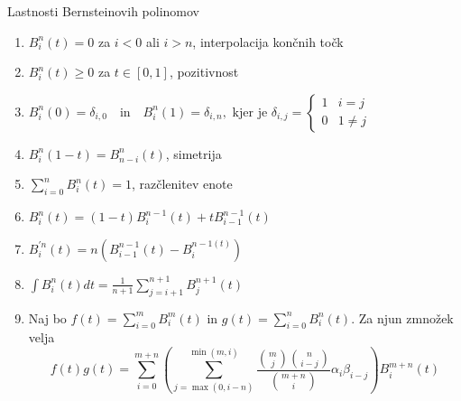 \documentclass[isrm2, tisk]{fmfdelo}
\begin{document}
    \begin{izrek}{Lastnosti Bernsteinovih polinomov}
        \label{izrek:bernsteinovi_lastnosti}
        \begin{enumerate}
            \item $B_i^n(t) = 0$ za $i<0$ ali $i>n$, interpolacija končnih točk \label{izrek:bernsteinovi_lastnosti:interpolacija}
            \item $B_i^n(t) \geq 0$ za $t\in[0,1]$, pozitivnost \label{izrek:bernsteinovi_lastnosti:pozitivnost}
            \item $B_i^n(0) = \delta_{i,0} \quad \text{in} \quad  B_i^n(1) = \delta_{i,n}, \text{ kjer je }  \delta_{i,j} = \begin{cases}
                                                                                                                                1 & i=j \\
                                                                                                                                0 & 1\neq j
            \end{cases}$
            \item $B_i^n(1-t) = B^n_{n-i}(t)$, simetrija \label{izrek:bernsteinovi_lastnosti:simetrija}
            \item $\sum_{i=0}^{n}B_{i}^{n}(t) = 1$, razčlenitev enote \label{izrek:bernsteinovi_lastnosti:enota}
            \item $B_i^n(t) = (1-t)B_i^{n-1}(t) + tB_{i-1}^{n-1}(t)$ \label{izrek:bernsteinovi_lastnosti:rekruzija}
            \item $B_{i}^{\prime n}(t)=n(B_{i-1}^{n-1}(t) - B_{i}^{n-1(t)})$ \label{izrek:bernsteinovi_lastnosti:odvod}
            \item $\int B_i^n(t)dt= \frac{1}{n+1}\sum^{n+1}_{j=i+1}B_{j}^{n+1}(t)$ \label{izrek:bernsteinovi_lastnosti:integral}
            \item{\label{izrek:bernsteinovi_lastnosti:mnozenje} Naj bo $f(t)=\sum_{i=0}^{m}B_i^m(t)$ in $g(t)=\sum_{i=0}^{n}B_i^n(t)$.
            Za njun zmnožek velja
                \[ f(t)g(t) = \sum_{i=0}^{m+n}\left(\sum_{j=\max(0,i-n)}^{\min(m,i)} \frac{\binom{m}{j}\binom{n}{i-j}}{\binom{m+n}{i}} \alpha_i\beta_{i-j} \right)B_{i}^{m+n}(t)\]
            }
        \end{enumerate}
    \end{izrek}
\end{document}
